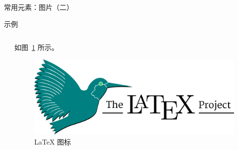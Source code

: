 \begin{frame}[fragile]{常用元素：图片（二）}
  \begin{exampleblock}{示例}
    \begin{columns}
      \begin{column}{0.6\textwidth}
      \end{column}

      \begin{column}{0.35\textwidth}
        如图~\ref{fig_logo_} 所示。
        \begin{figure}
          \centering
          \includegraphics[width=1.0\textwidth]{logo.png}
          \caption{\LaTeX{} 图标}
          \label{fig_logo_}  %
        \end{figure}
      \end{column}
    \end{columns}
  \end{exampleblock}


\end{frame}
